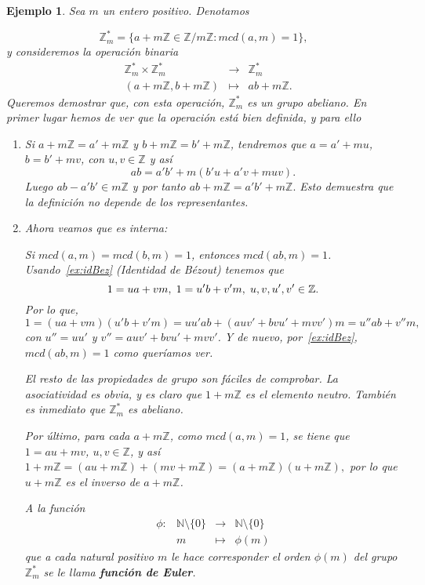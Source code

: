 \documentclass[12pt]{article}
\newtheorem{example}{Ejemplo}[theorem]
\begin{document}
\begin{example}Sea $m$ un entero positivo. Denotamos 

$$\mathbb{Z}_{m}^{\ast} = \lbrace a +m\mathbb{Z} \in \mathbb{Z} / m\mathbb{Z} : mcd(a,m)= 1 \rbrace,$$
y consideremos la operación binaria $$\begin{array}{rccl}
&\mathbb{Z}_{m}^{\ast} \times \mathbb{Z}_{m}^{\ast} & \longrightarrow & \mathbb{Z}_{m}^{\ast}\\
&(a+m\mathbb{Z},b+m\mathbb{Z})& \longmapsto &ab+m\mathbb{Z}.
\end{array}
$$
Queremos demostrar que, con esta operación, $\mathbb{Z}^\ast_m$ es un grupo abeliano. En primer lugar hemos de ver que la operación está bien definida, y para ello 
\begin{enumerate}
\item Si $a + m\mathbb{Z} = a' + m\mathbb{Z}$ y $b + m\mathbb{Z} = b' + m\mathbb{Z}$, tendremos que $a = a' + mu$, $b = b' + mv$, con $u,v \in \mathbb{Z}$ y así $$ab = a'b' + m(b'u + a'v + muv).$$ Luego $ab - a'b' \in m\mathbb{Z}$ y por tanto $ab + m\mathbb{Z} = a'b' + m\mathbb{Z}.$ Esto demuestra que la definición no depende de los representantes.
\item Ahora veamos que es interna:

Si $mcd(a,m) = mcd(b,m) = 1$, entonces $mcd(ab,m) = 1$. Usando~\ref{ex:idBez} (Identidad de Bézout) tenemos que $$1 = ua +vm, \hspace{0.1cm} 1= u'b + v'm, \hspace{0.1cm} u,v,u',v' \in \mathbb{Z}.$$ Por lo que, $$1 = (ua +vm)(u'b + v'm)= uu'ab+(auv'+bvu' + mvv')m = u'' ab + v''m,$$
con $u''= uu'$ y $v''= auv'+bvu' + mvv'$. Y de nuevo, por~\ref{ex:idBez}, $mcd(ab,m)=1$ como queríamos ver.

El resto de las propiedades de grupo son fáciles de comprobar. La asociatividad es obvia, y es claro que $1 + m\mathbb{Z}$ es el elemento neutro. También es inmediato que $\mathbb{Z}^\ast_m$ es abeliano. 

Por último, para cada $a + m\mathbb{Z}$, como $mcd(a,m)=1$, se tiene que $1= au+mv$, $u,v \in \mathbb{Z}$, y así $1 + m\mathbb{Z} = (au+ m\mathbb{Z}) + (mv + m\mathbb{Z}) = (a + m\mathbb{Z})(u+ m\mathbb{Z}),$ por lo que $u + m\mathbb{Z}$ es el inverso de $a + m\mathbb{Z}$.

A la función $$\begin{array}{rccl}
\phi\colon &\mathbb{N}\setminus \lbrace 0 \rbrace & \longrightarrow &\mathbb{N}\setminus \lbrace 0 \rbrace\\
&m& \longmapsto &\phi (m)
\end{array}
$$ que a cada natural positivo $m$ le hace corresponder el orden $\phi(m)$ del grupo $\mathbb{Z}_{m}^{\ast}$ se le llama \textbf{función de Euler}.


\end{enumerate}
\end{example}
\end{document}
